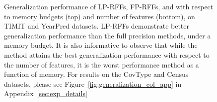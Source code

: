 \begin{figure}
\begin{tabular}{c@{\hskip 0in}c@{\hskip 0in}}
	\end{tabular}
	\caption{Generalization performance of LP-RFFs, FP-RFFs, and \Nystrom with respect to memory budgets (top) and number of features (bottom), on TIMIT and YearPred datasets.  LP-RFFs demonstrate better generalization performance than the full precision methods, under a memory budget. It is also informative to observe that while the \Nystrom method attains the best generalization performance with respect to the number of features, it is the worst performance method as a function of memory.
	For results on the CovType and Census datasets, please see Figure~\ref{fig:generalization_col_app} in Appendix~\ref{sec:exp_details}
}
	\label{fig:generalization_col}
\end{figure}


